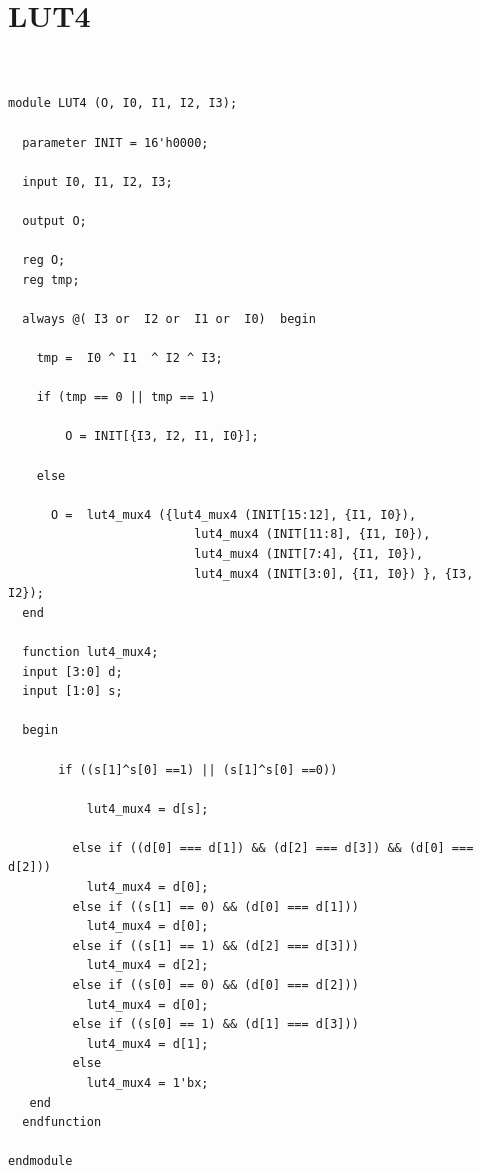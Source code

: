 \documentclass[a4paper,openright,12pt]{report}
\begin{document}
\section{LUT4}
\begin{lstlisting}


module LUT4 (O, I0, I1, I2, I3);

  parameter INIT = 16'h0000;

  input I0, I1, I2, I3;

  output O;

  reg O;
  reg tmp;

  always @( I3 or  I2 or  I1 or  I0)  begin
 
    tmp =  I0 ^ I1  ^ I2 ^ I3;

    if (tmp == 0 || tmp == 1)

        O = INIT[{I3, I2, I1, I0}];

    else 
    
      O =  lut4_mux4 ({lut4_mux4 (INIT[15:12], {I1, I0}),
                          lut4_mux4 (INIT[11:8], {I1, I0}),
                          lut4_mux4 (INIT[7:4], {I1, I0}),
                          lut4_mux4 (INIT[3:0], {I1, I0}) }, {I3, I2});
  end

  function lut4_mux4;
  input [3:0] d;
  input [1:0] s;
   
  begin

       if ((s[1]^s[0] ==1) || (s[1]^s[0] ==0))
           
           lut4_mux4 = d[s];

         else if ((d[0] === d[1]) && (d[2] === d[3]) && (d[0] === d[2])) 
           lut4_mux4 = d[0];
         else if ((s[1] == 0) && (d[0] === d[1]))
           lut4_mux4 = d[0];
         else if ((s[1] == 1) && (d[2] === d[3])) 
           lut4_mux4 = d[2];
         else if ((s[0] == 0) && (d[0] === d[2])) 
           lut4_mux4 = d[0];
         else if ((s[0] == 1) && (d[1] === d[3]))
           lut4_mux4 = d[1];
         else
           lut4_mux4 = 1'bx;
   end
  endfunction

endmodule

\end{lstlisting}
\end{document}
